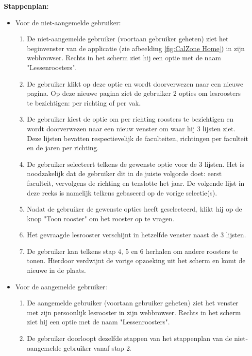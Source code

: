 \textbf{Stappenplan:}
\begin{itemize}
\item Voor de niet-aangemelde gebruiker: 
	\begin{enumerate}
		\item De niet-aangemelde gebruiker (voortaan gebruiker geheten) ziet het beginvenster van de applicatie (zie afbeelding \ref{fig:CalZone Home}) in zijn webbrowser. Rechts in het scherm ziet hij een optie met de naam "Lessenroosters".
		\item De gebruiker klikt op deze optie en wordt doorverwezen naar een nieuwe pagina. Op deze nieuwe pagina ziet de gebruiker 2 opties om lesroosters te bezichtigen: per richting of per vak.
		\item De gebruiker kiest de optie om per richting roosters te bezichtigen en wordt doorverwezen naar een nieuw venster om waar hij 3 lijsten ziet. Deze lijsten bevatten respectievelijk de faculteiten, richtingen per faculteit en de jaren per richting.
		\item De gebruiker selecteert telkens de gewenste optie voor de 3 lijsten. Het is noodzakelijk dat de gebruiker dit in de juiste volgorde doet: eerst faculteit, vervolgens de richting en tenslotte het jaar. De volgende lijst in deze reeks is namelijk telkens gebaseerd op de vorige selectie(s).
		\item Nadat de gebruiker de gewenste opties heeft geselecteerd, klikt hij op de knop "Toon rooster" om het rooster op te vragen.
		\item Het gevraagde lesrooster verschijnt in hetzelfde venster naast de 3 lijsten.
		\item De gebruiker kan telkens stap 4, 5 en 6 herhalen om andere roosters te tonen. Hierdoor verdwijnt de vorige opzoeking uit het scherm en komt de nieuwe in de plaats.
	\end{enumerate}
\item Voor de aangemelde gebruiker:
	\begin{enumerate}
	\item De aangemelde gebruiker (voortaan gebruiker geheten) ziet het venster met zijn persoonlijk lesrooster in zijn webbrowser. Rechts in het scherm ziet hij een optie met de naam "Lessenroosters".
	\item De gebruiker doorloopt dezelfde stappen van het stappenplan van de niet-aangemelde gebruiker vanaf stap 2.
	\end{enumerate}
\end{itemize}

